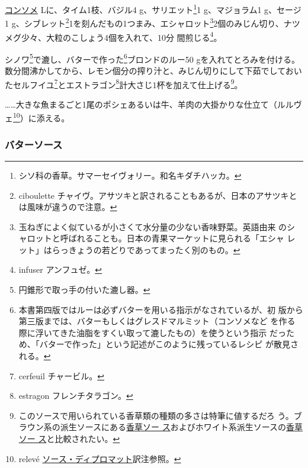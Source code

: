 \begin{recette}

\protect\hyperlink{consomme-blanc}{コンソメ}\undemi{}
Lに、タイム1枝、バジル4 g、サリエット\footnote{シソ科の香草。サマーセイヴォリー。和名キダチハッカ。}1
g、マジョラム1 g、セージ1 g、シブレット\footnote{ciboulette
  チャイヴ。アサツキと訳されることもあるが、日本のアサツキとは風味が違うので注意。}1を刻んだもの1つまみ、エシャロット\footnote{玉ねぎによく似ているが小さくて水分量の少ない香味野菜。英語由来
  のシャロットと呼ばれることも。日本の青果マーケットに見られる「エシャ
  レット」はらっきょうの若どりであってまったく別のもの。}2個のみじん切り、ナツメグ少々、大粒のこしょう4個を入れて、10分
間煎じる\footnote{infuser アンフュゼ。}。

シノワ\footnote{円錐形で取っ手の付いた漉し器。}で漉し、バターで作った\footnote{本書第四版ではルーは必ずバターを用いる指示がなされているが、初
  版から第三版までは、バターもしくはグレスドマルミット（コンソメなど
  を作る際に浮いてきた油脂をすくい取って漉したもの）を使うという指示
  だっため、「バターで作った」という記述がこのように残っているレシピ
  が散見される。}ブロンドのルー50
gを入れてとろみを付ける。数分間沸かしてから、レモン\undemi{}個分の搾り汁と、みじん切りにして下茹でしておいたセルフイユ\footnote{cerfeuil
  チャービル。}とエストラゴン\footnote{estragon フレンチタラゴン。}計大さじ1杯を加えて仕上げる\footnote{このソースで用いられている香草類の種類の多さは特筆に値するだろ
  う。ブラウン系の派生ソースにある\protect\hyperlink{sauce-aux-fines-herbes}{香草ソー
  ス}およびホワイト系派生ソースの\protect\hyperlink{sauce-aux-fines-herbes-blanche}{香草ソー
  ス}と比較されたい。}。

\ldots{}\ldots{}大きな魚まるごと1尾のポシェあるいは牛、羊肉の大掛かりな仕立て（ルルヴェ\footnote{relevé
  \protect\hyperlink{sauce-diplomate}{ソース・ディプロマット}訳注参照。}）に添える。

\maeaki

\hypertarget{butter-sauce}{%
\subsubsection{バターソース}\label{butter-sauce}}



\end{recette}
